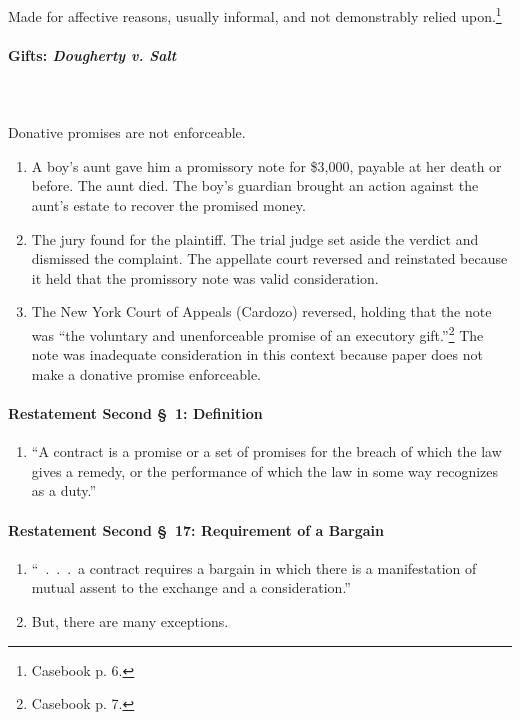 Made for affective reasons, usually informal, and not demonstrably relied 
upon.\footnote{Casebook p. 6.}

\paragraph{Gifts: \emph{Dougherty v. Salt}}
~\\\\
Donative promises are not enforceable.

\begin{enumerate}
    \item A boy's aunt gave him a promissory note for \$3,000, payable at her 
    death or before. The aunt died. The boy's guardian brought an action 
    against the aunt's estate to recover the promised money.
    \item The jury found for the plaintiff. The trial judge set aside the 
    verdict and dismissed the complaint. The appellate court reversed and 
    reinstated because it held that the promissory note was valid 
    consideration.
    \item The New York Court of Appeals (Cardozo) reversed, holding that the 
    note was ``the voluntary and unenforceable promise of an executory 
    gift.''\footnote{Casebook p. 7.} The note was inadequate consideration in 
    this context because paper does not make a donative promise enforceable.
\end{enumerate}

\paragraph{Restatement Second \S\ 1: Definition}

\begin{enumerate}
    \item ``A contract is a promise or a set of promises for the breach of 
    which the law gives a remedy, or the performance of which the law in some 
    way recognizes as a duty.''
\end{enumerate}

\paragraph{Restatement Second \S\ 17: Requirement of a Bargain}

\begin{enumerate}
    \item ``~.~.~.~a contract requires a bargain in which there is a 
    manifestation of mutual assent to the exchange and a consideration.''
    \item But, there are many exceptions.
\end{enumerate}

